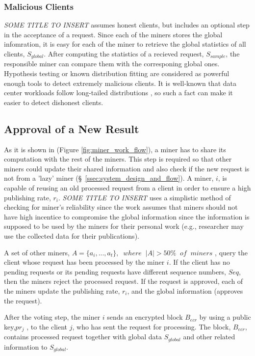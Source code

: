 \documentclass{article}
\newcommand{\projTitle}{SOME TITLE TO INSERT}
\begin{document}
\subsubsection{Malicious Clients} \label{sssec:malicious_client}
\textit{\projTitle} assumes honest clients, but includes an optional step in the acceptance of a request. Since each of the miners stores the global infomration, it is easy for each of the miner to retrieve the global statistics of all clients, $S_{global}$. After computing the statistics of a recieved request, $S_{sample}$, the responsible miner can compare them with the corresponing global ones. Hypothesis testing or known distribution fitting \cite{walpole_statistics} are considered as powerful enough tools to detect extremely malicious clients. It is well-known that data center workloads follow long-tailed distributions \cite{diurnal_pattern_data_center_2, dctcp_ref, pFabric_ref}, so such a fact can make it easier to detect dishonest clients.   

\subsection{Approval of a New Result}
As it is shown in (Figure \ref{fig:miner_work_flow}), a miner has to share its computation with the rest of the miners.  This step is required so that other miners could update their shared information and also check if the new request is not from a 'lazy' miner (\S\ \ref{ssec:system_design_and_flow}). A miner, $i$, is capable of  reusing an old processed request from a client in order to ensure a high publishing rate, $r_i$. \textit{\projTitle} uses a simplistic method of checking for miner's reliability since the work assumes that miners should not have high incentice to compromise the global information since the information is supposed to be used by the miners for their personal work (e.g., researcher may use the collected data for their publications). 

\noindent \newline A set of other miners, $A= \{a_i, ..., a_t\}, \; \; where \; \; |A| > 50\% \; \; of \; \; miners$ , query the client whose request has been processed by the miner $i$. If the client has no pending requests or its pending requests have different sequence numbers, $Seq$, then the miners reject the processed request. If the request is approved, each of the miners update the publishing rate, $r_i$, and the global information (approves the request).

\noindent \newline After the voting step, the miner $i$ sends an encrypted block $B_{ecr}$ by using a public key,$pr_j$ , to the client $j$, who has sent the request for processing. The block, $B_{ecr}$, contains processed request together with global data $S_{global}$  and other related information to $S_{global}$.  
 

\newpage


\end{document}

